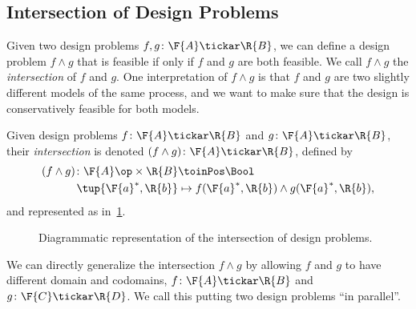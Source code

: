 \subsection{Intersection of Design Problems}
Given two design problems $f, g \colon \F{A} \tickar \R{B}$, we can define a design problem $f \wedge g$ that is feasible if only if $f$ and $g$ are both feasible. We call $f \wedge g$ the \emph{intersection} of $f$ and $g$. One interpretation of $f \wedge g$ is that $f$ and $g$ are two slightly different models of the same process, and we want to make sure that the design is conservatively feasible for both models.

\begin{definition}
Given design problems $f\colon \F{A} \tickar \R{B}$ and $g\colon \F{A} \tickar \R{B}$,
their \emph{intersection} is denoted $(f \wedge g)\colon \F{A} \tickar \R{B}$, defined by
\begin{equation}
	\begin{aligned}
		(f \wedge g)\colon \F{A}\op \times \R{B} & \toinPos \Bool \\
		\tup{\F{a}^*, \R{b}} & \mapsto f(\F{a}^*, \R{b}) \wedge  g(\F{a}^*, \R{b}),
	\end{aligned}
\end{equation}
and represented as in~\cref{fig:intersectiondp}.
\end{definition}

\begin{figure}[h!]
\begin{center}
\end{center}
\caption{Diagrammatic representation of the intersection of design problems. \label{fig:intersectiondp}}
\end{figure}

We can directly generalize the intersection $f \wedge g$ by allowing $f$ and $g$ to have different domain and codomains, $f \colon \F{A} \tickar \R{B}$ and $g \colon \F{C} \tickar \R{D}$. We call this putting two design problems ``in parallel''.


